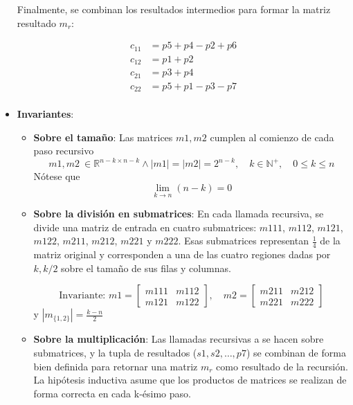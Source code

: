 \documentclass[12pt, a4paper]{article}
\begin{document}
\begin{itemize}
    Finalmente, se combinan los resultados intermedios para formar la matriz resultado $m_r$:
    
    \begin{align*}
    c_{11} &= p5 + p4 - p2 + p6 \\
    c_{12} &= p1 + p2 \\
    c_{21} &= p3 + p4 \\
    c_{22} &= p5 + p1 - p3 - p7 \\
    \end{align*}

    \item \textbf{Invariantes}: 
    \begin{itemize}
        \item \textbf{Sobre el tamaño}: Las matrices $m1, m2$ cumplen al comienzo de cada paso recursivo\[
            m1, m2~\in \mathbb{R}^{n-k \times n-k} \land |m1|=|m2|= 2^{n-k}, \quad k \in \mathbb{N}^+,\quad 0 \leq k \leq n 
          \]
          Nótese que
          \[
            \lim_{k\to n} (n-k) = 0
          \]
          
        \item \textbf{Sobre la división en submatrices}: En cada llamada recursiva, se divide una matriz de entrada en cuatro submatrices: $m{{1{11}}}$, $m{{1{12}}}$, $m{{1{21}}}$, $m{{1{22}}}$, $m{{2{11}}}$, $m{{2{12}}}$, $m{{2{21}}}$ y $m{{2{22}}}$. Esas submatrices representan $\frac{1}{4}$ de la matriz original y corresponden a una de las cuatro regiones dadas por $k, k/2$ sobre el tamaño de sus filas y columnas.

        \[
        \text{{Invariante: }} m1 = \begin{bmatrix} m{{1{11}}} & m{{1{12}}} \\ m{{1{21}}} & m{{1{22}}} \end{bmatrix}, \quad
        m2 = \begin{bmatrix} m{{2{11}}} & m{{2{12}}} \\ m{{2{21}}} & m{{2{22}}} \end{bmatrix}
        \]
        y $|m_{\{1,2\}}| = \frac{k-n}{2}$

        \item \textbf{Sobre la multiplicación}: Las llamadas recursivas a  se hacen sobre submatrices, y la tupla de resultados ($s1, s2, \ldots, p7$) se combinan de forma bien definida para retornar una matriz $m_r$ como resultado de la recursión. La hipótesis inductiva asume que los productos de matrices se realizan de forma correcta en cada k-ésimo paso.


\end{itemize}
\end{itemize}
\end{document}

